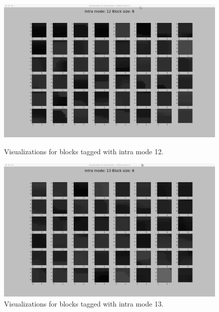 \begin{figure}
        \vspace*{1cm} %
        
        \begin{minipage}{0.49\textwidth}
            \includegraphics[width=\linewidth]{Figures/visu-size8x8/8-12}
            \caption[Visualizations for blocks tagged with intra mode 12]{Visualizations for blocks tagged with intra mode 12.}
            \label{fig:size8_mode12}
        \end{minipage}
        \hspace{\fill} %
        \begin{minipage}{0.49\textwidth}
            \includegraphics[width=\linewidth]{Figures/visu-size8x8/8-13}
            \caption[Visualizations for blocks tagged with intra mode 13]{Visualizations for blocks tagged with intra mode 13.}
            \label{fig:size8_mode13}
        \end{minipage}
        

\end{figure}
